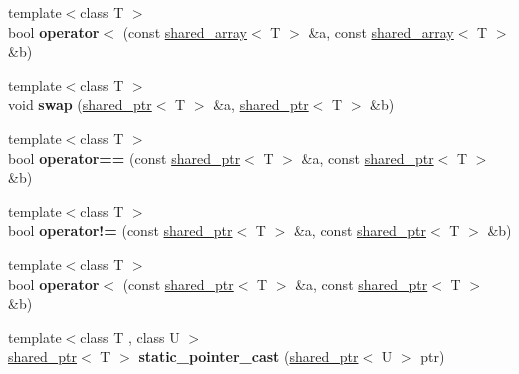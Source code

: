 \begin{DoxyCompactItemize}
\item 
\hypertarget{namespaceboost_a70d4c3d8ee70e1c4eb06245acc319c78}{{\footnotesize template$<$class T $>$ }\\bool {\bfseries operator$<$} (const \hyperlink{classboost_1_1shared__array}{shared\+\_\+array}$<$ T $>$ \&a, const \hyperlink{classboost_1_1shared__array}{shared\+\_\+array}$<$ T $>$ \&b)}\label{namespaceboost_a70d4c3d8ee70e1c4eb06245acc319c78}

\item 
\hypertarget{namespaceboost_a51f2976f1c5b8cf202f9b843361c56d0}{{\footnotesize template$<$class T $>$ }\\void {\bfseries swap} (\hyperlink{classboost_1_1shared__ptr}{shared\+\_\+ptr}$<$ T $>$ \&a, \hyperlink{classboost_1_1shared__ptr}{shared\+\_\+ptr}$<$ T $>$ \&b)}\label{namespaceboost_a51f2976f1c5b8cf202f9b843361c56d0}

\item 
\hypertarget{namespaceboost_abba2ca65f15a4ac3d792fddaa060649b}{{\footnotesize template$<$class T $>$ }\\bool {\bfseries operator==} (const \hyperlink{classboost_1_1shared__ptr}{shared\+\_\+ptr}$<$ T $>$ \&a, const \hyperlink{classboost_1_1shared__ptr}{shared\+\_\+ptr}$<$ T $>$ \&b)}\label{namespaceboost_abba2ca65f15a4ac3d792fddaa060649b}

\item 
\hypertarget{namespaceboost_a1636b69fb6198e5b32b88307920865a0}{{\footnotesize template$<$class T $>$ }\\bool {\bfseries operator!=} (const \hyperlink{classboost_1_1shared__ptr}{shared\+\_\+ptr}$<$ T $>$ \&a, const \hyperlink{classboost_1_1shared__ptr}{shared\+\_\+ptr}$<$ T $>$ \&b)}\label{namespaceboost_a1636b69fb6198e5b32b88307920865a0}

\item 
\hypertarget{namespaceboost_ae0875d9e8289d682a51829bbd849228f}{{\footnotesize template$<$class T $>$ }\\bool {\bfseries operator$<$} (const \hyperlink{classboost_1_1shared__ptr}{shared\+\_\+ptr}$<$ T $>$ \&a, const \hyperlink{classboost_1_1shared__ptr}{shared\+\_\+ptr}$<$ T $>$ \&b)}\label{namespaceboost_ae0875d9e8289d682a51829bbd849228f}

\item 
\hypertarget{namespaceboost_a61b2649dcc62c1a7980c80235a98dabc}{{\footnotesize template$<$class T , class U $>$ }\\\hyperlink{classboost_1_1shared__ptr}{shared\+\_\+ptr}$<$ T $>$ {\bfseries static\+\_\+pointer\+\_\+cast} (\hyperlink{classboost_1_1shared__ptr}{shared\+\_\+ptr}$<$ U $>$ ptr)}\label{namespaceboost_a61b2649dcc62c1a7980c80235a98dabc}


\end{DoxyCompactItemize}
